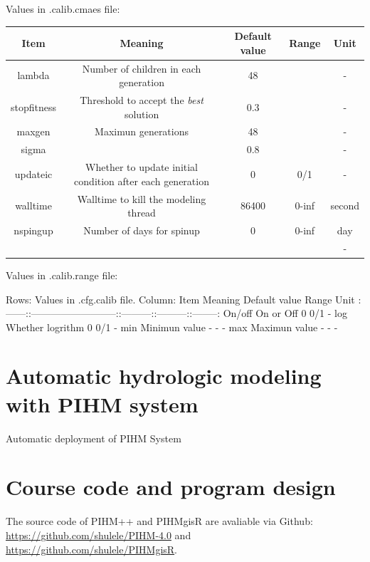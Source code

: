 \documentclass[]{scrbook}
\begin{document}
Values in .calib.cmaes file:

\begin{longtable}[]{@{}ccccc@{}}
\toprule
Item & Meaning & Default value & Range & Unit\tabularnewline
\midrule
\endhead
lambda & Number of children in each generation & 48 & & -\tabularnewline
stopfitness & Threshold to accept the \emph{best} solution & 0.3 & &
-\tabularnewline
maxgen & Maximun generations & 48 & & -\tabularnewline
sigma & & 0.8 & & -\tabularnewline
updateic & Whether to update initial condition after each generation & 0
& 0/1 & -\tabularnewline
walltime & Walltime to kill the modeling thread & 86400 & 0-inf &
second\tabularnewline
nspingup & Number of days for spinup & 0 & 0-inf & day\tabularnewline
& & & & -\tabularnewline
\bottomrule
\end{longtable}

Values in .calib.range file:

Rows: Values in .cfg.calib file. Column: \textbar{} Item \textbar{}
Meaning \textbar{} Default value \textbar{} Range \textbar{} Unit
\textbar{}
\textbar{}:------:\textbar{}:--------------------------:\textbar{}:---------:\textbar{}:---------:\textbar{}:--------:\textbar{}
\textbar{} On/off \textbar{} On or Off \textbar{} 0 \textbar{} 0/1
\textbar{} - \textbar{} \textbar{} log \textbar{} Whether logrithm
\textbar{} 0 \textbar{} 0/1 \textbar{} - \textbar{} \textbar{} min
\textbar{} Minimun value \textbar{} - \textbar{} - \textbar{} -
\textbar{} \textbar{} max \textbar{} Maximun value \textbar{} -
\textbar{} - \textbar{} - \textbar{}

\chapter{Automatic hydrologic modeling with PIHM
system}\label{automatic-hydrologic-modeling-with-pihm-system}

Automatic deployment of PIHM System

\chapter{Course code and program
design}\label{course-code-and-program-design}

The source code of PIHM++ and PIHMgisR are avaliable via Github:
\url{https://github.com/shulele/PIHM-4.0} and
\url{https://github.com/shulele/PIHMgisR}.


\end{document}
